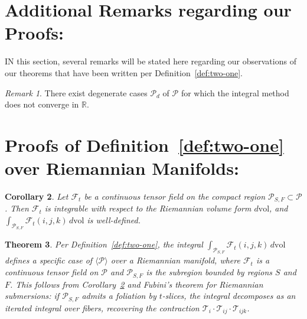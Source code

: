 \documentclass[10pt]{article}
\theoremstyle{plain}
\newtheorem{theorem}{Theorem}[section]
\newtheorem{corollary}[theorem]{Corollary}
\theoremstyle{definition}
\theoremstyle{remark}
\newtheorem{remark}[theorem]{Remark}
\begin{document}
\section{Additional Remarks regarding our Proofs:}

\lettrine[lines=1, lhang=0.1, loversize=0.2]{I}N this section, several remarks will be stated here regarding our observations of our theorems that have been written per Definition~\ref{def:two-one}.

\begin{remark}
\label{remark:one}
  There exist degenerate cases $\mathcal{P}_d$ of $\mathcal{P}$ for which the integral method does not converge in $\mathbb{R}$.
\end{remark}

\section{Proofs of Definition~\ref{def:two-one} over Riemannian Manifolds:}

\begin{corollary}
\label{cor:integrability}
  Let $\mathcal{F}_t$ be a continuous tensor field on the compact region $\mathcal{P}_{S,F} \subset \mathcal{P}$. Then $\mathcal{F}_t$ is integrable with respect to the Riemannian volume form $d\mathrm{vol}$, and $\int_{\mathcal{P}_{S,F}} \mathcal{F}_t(i,j,k)\,d\mathrm{vol}$ is well-defined.
\end{corollary}

\begin{theorem}
\label{theo:one}
  Per Definition~\ref{def:two-one}, the integral $\int_{\mathcal{P}_{S,F}} \mathcal{F}_t(i, j, k)\,d\mathrm{vol}$ defines a specific case of $\langle \mathcal{P} \rangle$ over a Riemannian manifold, where $\mathcal{F}_t$ is a continuous tensor field on $\mathcal{P}$ and $\mathcal{P}_{S,F}$ is the subregion bounded by regions $S$ and $F$. This follows from Corollary~\ref{cor:integrability} and Fubini's theorem for Riemannian submersions: if $\mathcal{P}_{S,F}$ admits a foliation by $t$-slices, the integral decomposes as an iterated integral over fibers, recovering the contraction $\mathcal{T}_i \cdot \mathcal{T}_{ij} \cdot \mathcal{T}_{ijk}$.
\end{theorem}
\end{document}
